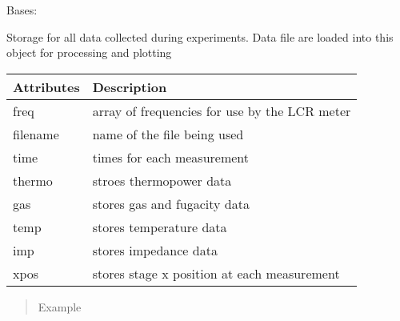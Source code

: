 \documentclass[letterpaper,10pt,english]{sphinxmanual}
\begin{document}
\begin{fulllineitems}
\label{\detokenize{source/laboratory.utils:laboratory.utils.data.Data}}
Bases: 

Storage for all data collected during experiments. Data file are loaded into this object for processing and plotting


\begin{savenotes}\sphinxattablestart
\centering
\begin{tabulary}{\linewidth}[t]{|T|T|}
\hline
\sphinxstyletheadfamily 
Attributes
&\sphinxstyletheadfamily 
Description
\\
\hline
freq
&
array of frequencies for use by the LCR meter
\\
\hline
filename
&
name of the file being used
\\
\hline
time
&
times for each measurement
\\
\hline
thermo
&
stroes thermopower data
\\
\hline
gas
&
stores gas and fugacity data
\\
\hline
temp
&
stores temperature data
\\
\hline
imp
&
stores impedance data
\\
\hline
xpos
&
stores stage x position at each measurement
\\
\hline
\end{tabulary}
\par
\sphinxattableend\end{savenotes}
\begin{quote}\begin{description}
\item[{Example}] \leavevmode
\end{description}\end{quote}

%
\begin{sphinxVerbatim}[commandchars=\\\{\}]
  
\end{sphinxVerbatim}


\end{fulllineitems}
\end{document}
